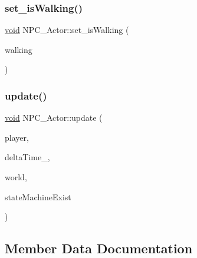 \mbox{\label{classNPC__Actor_a5df8dbfeafc9e69da41dbbeac85d92b2}} 
\subsubsection{\texorpdfstring{set\+\_\+is\+Walking()}{set\_isWalking()}}
{\footnotesize\ttfamily \hyperlink{imgui__impl__opengl3__loader_8h_ac668e7cffd9e2e9cfee428b9b2f34fa7}{void} N\+P\+C\+\_\+\+Actor\+::set\+\_\+is\+Walking (\begin{DoxyParamCaption}\item[{bool}]{walking }\end{DoxyParamCaption})\hspace{0.3cm}{\ttfamily [inline]}}

\mbox{\label{classNPC__Actor_a8bfe3a4223330ef3911d3cea91fff6cd}} 
\subsubsection{\texorpdfstring{update()}{update()}}
{\footnotesize\ttfamily \hyperlink{imgui__impl__opengl3__loader_8h_ac668e7cffd9e2e9cfee428b9b2f34fa7}{void} N\+P\+C\+\_\+\+Actor\+::update (\begin{DoxyParamCaption}\item[{std\+::shared\+\_\+ptr$<$ \hyperlink{classPlayer__Actor}{Player\+\_\+\+Actor} $>$}]{player,  }\item[{const float}]{delta\+Time\+\_\+,  }\item[{b2\+World $\ast$}]{world,  }\item[{bool}]{state\+Machine\+Exist }\end{DoxyParamCaption})}



\subsection{Member Data Documentation}
\mbox{\label{classNPC__Actor_a9af988fb1e657f9d8aed581cb6ad4b92}} 
